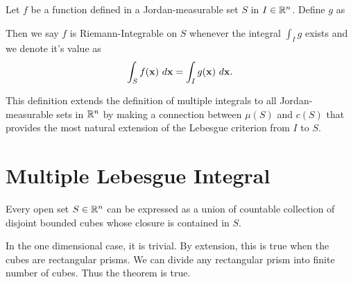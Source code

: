 \documentclass[10pt,a4paper]{book}
\begin{document}
\begin{itemize}
\renewcommand{\if}{\text{  if  }}
\begin{deff}
Let $f$ be a function defined in a Jordan-measurable set $S$ in $I \in \mathbb{R}^n$. Define $g$ as


Then we say $f$ is Riemann-Integrable on $S$ whenever the integral $\int_I g $ exists and we denote it's value as
$$\int_S f(\mathbf{x})\ d \mathbf{x} = \int_I g(\mathbf{x})\ d \mathbf{x}.$$
\end{deff}
\PP This definition extends the definition of multiple integrals to all Jordan-measurable sets in $\mathbb{R}^n$  by making a connection between $\mu(S)$ and $c(S)$ that provides the most natural extension of the Lebesgue criterion from $I$ to $S$.




\end{itemize}
\section*{Multiple Lebesgue Integral}
\begin{Thm}
Every open set $S \in \mathbb{R}^n$ can be expressed as a union of countable collection of disjoint bounded cubes whose closure is contained in $S$.
\end{Thm}
\PP In the one dimensional case, it is trivial. By extension, this is true when the cubes are rectangular prisms. We can divide any rectangular prism into finite number of cubes. Thus the theorem is true.
\end{document}
